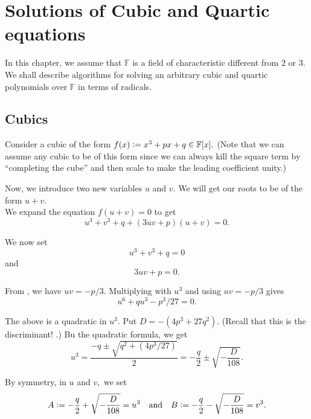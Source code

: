 \chapter{Solutions of Cubic and Quartic equations} \label{chap:solutionscubicandquartics}

In this chapter, we assume that $\mathbb{F}$ is a field of characteristic different from $2$ or $3.$ We shall describe algorithms for solving an arbitrary cubic and quartic polynomials over $\mathbb{F}$ in terms of radicals.

\section{Cubics}

Consider a cubic of the form $f(x) \vcentcolon= x^3 + px + q \in \mathbb{F}[x].$ (Note that we can assume any cubic to be of this form since we can always kill the square term by ``completing the cube'' and then scale to make the leading coefficient unity.)

Now, we introduce two new variables $u$ and $v.$ We will get our roots to be of the form $u + v.$ \\
We expand the equation $f(u + v) = 0$ to get
\begin{equation*} 
	u^3 + v^3 + q + (3uv + p)(u + v) = 0.
\end{equation*}

We now set
\begin{equation} \label{eq:008}
	u^3 + v^3 + q = 0
\end{equation}
and
\begin{equation} \label{eq:009}
	3uv + p = 0.
\end{equation}

From , we have $uv = -p/3.$ Multiplying  with $u^3$ and using $uv = -p/3$ gives
\begin{equation*} 
	u^6 + qu^3 - p^3/27 = 0.
\end{equation*}

The above is a quadratic in $u^3.$ Put $D = -(4p^3 + 27q^2).$ (Recall that this is the discriminant! .) Bu the quadratic formula, we get
\begin{equation*} 
	u^3 = \frac{-q \pm \sqrt{q^2 + (4p^3/27)}}{2} = -\frac{q}{2} \pm \sqrt{-\frac{D}{108}}.
\end{equation*}

By symmetry, in $u$ and $v,$ we set
\begin{equation*} 
	A \vcentcolon= -\frac{q}{2} + \sqrt{-\frac{D}{108}} = u^3 \quad\text{and}\quad B \vcentcolon= -\frac{q}{2} - \sqrt{-\frac{D}{108}} = v^3.
\end{equation*}


